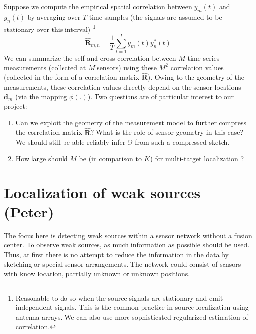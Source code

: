  Suppose we compute the empirical spatial correlation between $y_m(t)$ and $y_n(t)$  by averaging over $T$ time samples (the signals are assumed to be stationary over this interval) \footnote{Reasonable to do so when the source signals are stationary and emit independent signals. This is the common practice in source localization using antenna arrays. We can also use more sophisticated regularized estimation of correlation.}
\begin{equation}
\mathbf{\hat{R}}_{m,n} = \frac{1}{T}\sum_{t=1}^{T} y_m (t) y^*_n (t) 
\end{equation} 
We can summarize the self and cross correlation between $M$ time-series measurements (collected at $M$ sensors) using these $M^2$ correlation values (collected in the form of a correlation matrix $\mathbf{\hat{R}}$). Owing to the geometry of the measurements, these correlation values directly depend on the sensor locations $\mathbf{d}_m$  (via the mapping $\phi(.)$). Two questions are of particular interest to our project:
\begin{enumerate}
\item Can we exploit the geometry of the measurement model to further compress the  correlation matrix $\mathbf{\hat{R}}$? What is the role of sensor geometry in this case? We should still be able reliably infer $\Theta$ from such a compressed sketch.
\item How large should $M$ be (in comparison to $K$) for multi-target localization ?
\end{enumerate}


\section{Localization of weak sources (Peter)}


The focus here is detecting weak sources within a sensor network without a fusion center. To observe weak sources, as much information as possible should be used. Thus, at first there is no attempt to reduce the information in the data by sketching or special sensor arrangements. The network could consist of sensors with know location, partially unknown or unknown positions.

